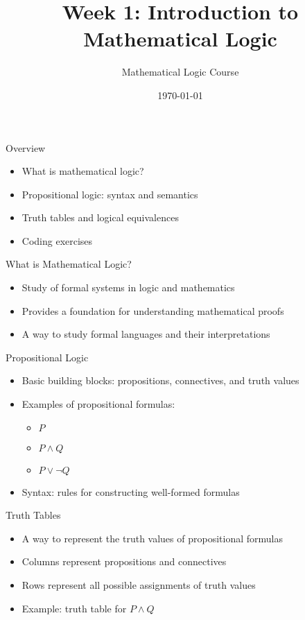\documentclass[presentation]{beamer}
\author{Mathematical Logic Course}
\date{\today}
\title{Week 1: Introduction to Mathematical Logic}
\begin{document}
\maketitle

\begin{frame}[label={sec:org117628a}]{Overview}
\begin{itemize}
\item What is mathematical logic?
\item Propositional logic: syntax and semantics
\item Truth tables and logical equivalences
\item Coding exercises
\end{itemize}
\end{frame}

\begin{frame}[label={sec:org5201563}]{What is Mathematical Logic?}
\begin{itemize}
\item Study of formal systems in logic and mathematics
\item Provides a foundation for understanding mathematical proofs
\item A way to study formal languages and their interpretations
\end{itemize}
\end{frame}

\begin{frame}[label={sec:org6e33fa1}]{Propositional Logic}
\begin{itemize}
\item Basic building blocks: propositions, connectives, and truth values
\item Examples of propositional formulas:
\begin{itemize}
\item \(P\)
\item \(P \land Q\)
\item \(P \lor \neg Q\)
\end{itemize}
\item Syntax: rules for constructing well-formed formulas
\end{itemize}
\end{frame}

\begin{frame}[label={sec:org2145ef3}]{Truth Tables}
\begin{itemize}
\item A way to represent the truth values of propositional formulas
\item Columns represent propositions and connectives
\item Rows represent all possible assignments of truth values
\item Example: truth table for \(P \land Q\)
\end{itemize}
\end{frame}
\end{document}
